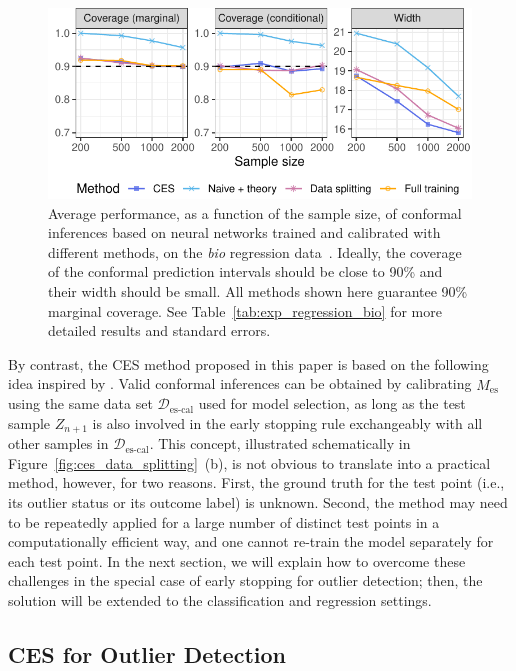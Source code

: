 \begin{figure}[!htb]
    \centering
    \includegraphics[width=\linewidth]{figures/exp_regression_bio_small.pdf}\vspace{-0.5cm}
    \caption{Average performance, as a function of the sample size, of conformal inferences based on neural networks trained and calibrated with different methods, on the {\em bio} regression data~\cite{data-bio}. Ideally, the coverage of the conformal prediction intervals should be close to 90\% and their width should be small. All methods shown here guarantee 90\% marginal coverage. See Table~\ref{tab:exp_regression_bio} for more detailed results and standard errors.}
    \label{fig:exp_regression_bio}
\end{figure}

By contrast, the CES method proposed in this paper is based on the following idea inspired by \citet{Liang_2022_integrative_p_val}.
Valid conformal inferences can be obtained by calibrating $\hat{M}_{\text{es}}$ using the same data set $\mathcal{D}_{\text{es-cal}}$ used for model selection, as long as the test sample  $Z_{n+1}$ is also involved in the early stopping rule exchangeably with all other samples in $\mathcal{D}_{\text{es-cal}}$.
This concept, illustrated schematically in Figure~\ref{fig:ces_data_splitting}~(b), is not obvious to translate into a practical method, however, for two reasons.
First, the ground truth for the test point (i.e., its outlier status or its outcome label) is unknown. Second, the method may need to be repeatedly applied for a large number of distinct test points in a computationally efficient way, and one cannot re-train the model separately for each test point.
In the next section, we will explain how to overcome these challenges in the special case of early stopping for outlier detection; then, the solution will be extended to the classification and regression settings.

\subsection{CES for Outlier Detection} \label{sec:outlier}


